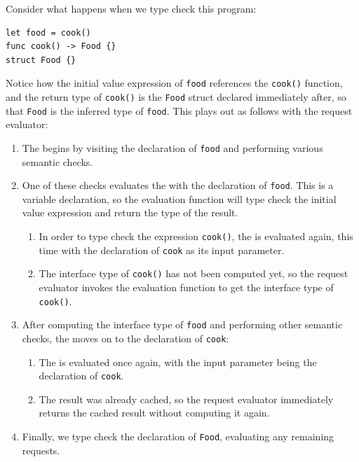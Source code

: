 \documentclass[../generics]{subfiles}
\begin{document}
\begin{example}
Consider what happens when we type check this program:
\begin{Verbatim}
let food = cook()
func cook() -> Food {}
struct Food {}
\end{Verbatim}
Notice how the initial value expression of \texttt{food} references the \texttt{cook()} function, and the return type of \texttt{cook()} is the \texttt{Food} struct declared immediately after, so that \texttt{Food} is the inferred type of \texttt{food}. This plays out as follows with the request evaluator:
\begin{enumerate}
\item The  begins by visiting the declaration of \texttt{food} and performing various semantic checks.
\item One of these checks evaluates the  with the declaration of \texttt{food}. This is a variable declaration, so the evaluation function will type check the initial value expression and return the type of the result.
\begin{enumerate}
\item In order to type check the expression \texttt{cook()}, the  is evaluated again, this time with the declaration of \texttt{cook} as its input parameter.
\item The interface type of \texttt{cook()} has not been computed yet, so the request evaluator invokes the evaluation function to get the interface type of \texttt{cook()}.
\end{enumerate}
\item After computing the interface type of \texttt{food} and performing other semantic checks, the  moves on to the declaration of \texttt{cook}:
\begin{enumerate}
\item The  is evaluated once again, with the input parameter being the declaration of \texttt{cook}.
\item The result was already cached, so the request evaluator immediately returns the cached result without computing it again.
\end{enumerate}
\item Finally, we type check the declaration of \texttt{Food}, evaluating any remaining requests.
\end{enumerate}
\end{example}
\end{document}
